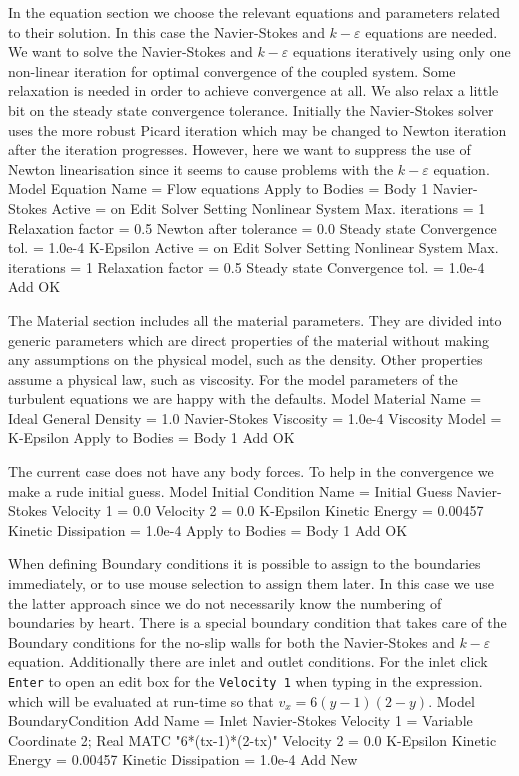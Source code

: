 In the equation section we choose the relevant equations and 
parameters related to their solution. 
In this case the Navier-Stokes and $k-\varepsilon$ equations are needed.
We want to solve the Navier-Stokes and $k-\varepsilon$ equations iteratively using only one non-linear iteration
for optimal convergence of the coupled system. Some relaxation is needed in order to achieve convergence 
at all. We also relax a little bit on the steady state convergence tolerance. 
Initially the Navier-Stokes
solver uses the more robust Picard iteration which may be changed to Newton iteration after the iteration 
progresses. However, here we want to suppress the use of Newton linearisation since it seems to
cause problems with the $k-\varepsilon$ equation.
\ttbegin
Model
  Equation
    Name = Flow equations
    Apply to Bodies = Body 1
    Navier-Stokes 
      Active = on
      Edit Solver Setting
        Nonlinear System
          Max. iterations = 1
          Relaxation factor = 0.5
          Newton after tolerance = 0.0
        Steady state
          Convergence tol. = 1.0e-4
    K-Epsilon 
      Active = on
      Edit Solver Setting
        Nonlinear System
          Max. iterations = 1
          Relaxation factor = 0.5
        Steady state
          Convergence tol. = 1.0e-4
    Add 
    OK
\ttend        

The Material section includes all the material parameters.
They are divided into generic parameters which are direct properties of the material
without making any assumptions on the physical model, such as the density. Other properties assume
a physical law, such as viscosity. For the model parameters of the turbulent equations we are 
happy with the defaults. 
\ttbegin
Model
  Material
    Name = Ideal
    General 
      Density = 1.0
    Navier-Stokes 
      Viscosity = 1.0e-4
      Viscosity Model = K-Epsilon
    Apply to Bodies = Body 1 
    Add
    OK
\ttend

The current case does not have any body forces. To help in the convergence we make 
a rude initial guess.
\ttbegin
Model
  Initial Condition 
    Name = Initial Guess
    Navier-Stokes
      Velocity 1 = 0.0
      Velocity 2 = 0.0
    K-Epsilon
      Kinetic Energy = 0.00457
      Kinetic Dissipation = 1.0e-4
    Apply to Bodies = Body 1 
    Add
    OK
\ttend

When defining Boundary conditions it is possible to assign to the boundaries immediately, or to use mouse
selection to assign them later. In this case we use the latter approach since we do not necessarily know 
the numbering of boundaries by heart.
There is a special boundary condition that takes care of the 
Boundary conditions for the no-slip walls for both the Navier-Stokes and
$k-\varepsilon$ equation. Additionally there are inlet and outlet conditions. 
For the inlet click \texttt{Enter} to open an edit box for the \texttt{Velocity 1} when typing in the expression.
which will be evaluated at run-time so that $v_x=6(y-1)(2-y)$. 
\ttbegin
Model
  BoundaryCondition
    Add 
    Name = Inlet
    Navier-Stokes 
      Velocity 1 = Variable Coordinate 2; Real MATC "6*(tx-1)*(2-tx)"
      Velocity 2 = 0.0
    K-Epsilon
      Kinetic Energy = 0.00457
      Kinetic Dissipation = 1.0e-4
    Add
    New

